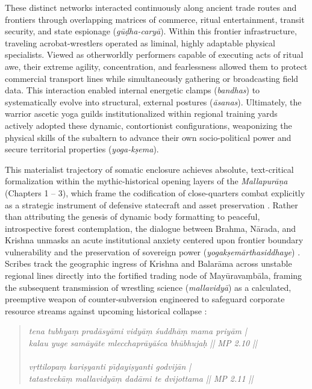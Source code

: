 \documentclass[11pt,twoside,letterpaper]{article}
\begin{document}
These distinct networks interacted continuously along ancient trade routes and frontiers through overlapping matrices of commerce, ritual entertainment, transit security, and state espionage (\textit{g\={u}\d{d}ha-cary\={a}}). Within this frontier infrastructure, traveling acrobat-wrestlers operated as liminal, highly adaptable physical specialists. Viewed as otherworldly performers capable of executing acts of ritual awe, their extreme agility, concentration, and fearlessness allowed them to protect commercial transport lines while simultaneously gathering or broadcasting field data. This interaction enabled internal energetic clamps (\textit{bandhas}) to systematically evolve into structural, external postures (\textit{\={a}sanas}). Ultimately, the warrior ascetic yoga guilds institutionalized within regional training yards actively adopted these dynamic, contortionist configurations, weaponizing the physical skills of the subaltern to advance their own socio-political power and secure territorial properties (\textit{yoga-k\d{s}ema}).

This materialist trajectory of somatic enclosure achieves absolute, text-critical formalization within the mythic-historical opening layers of the \textit{Mallapur\={a}\d{n}a} (Chapters 1 -- 3), which frame the codification of close-quarters combat explicitly as a strategic instrument of defensive statecraft and asset preservation \citep{MP_7_v1}. Rather than attributing the genesis of dynamic body formatting to peaceful, introspective forest contemplation, the dialogue between Brahma, N\={a}rada, and Krishna unmasks an acute institutional anxiety centered upon frontier boundary vulnerability and the preservation of sovereign power (\textit{yogak\d{s}em\={a}rthasiddhaye}) \citep{MP_7_v2}. Scribes track the geographic ingress of Krishna and Balar\={a}ma across unstable regional lines directly into the fortified trading node of May\={u}rava\d{m}b\={a}la, framing the subsequent transmission of wrestling science (\textit{mallavidy\={a}}) as a calculated, preemptive weapon of counter-subversion engineered to safeguard corporate resource streams against upcoming historical collapse \citep{MP_7_v3}:

\begin{quote}
\small
\noindent\textit{tena tubhya\d{m} prad\={a}sy\={a}mi vidy\={a}\d{m} \'{s}uddh\={a}\d{m} mama priy\={a}m |} \\
\noindent\textit{kalau yuge sam\={a}y\={a}te mlecchapr\={a}y\={a}\'{s}ca bh\={u}bhuja\d{h} || MP 2.10 ||} \\
\\
\noindent\textit{v\d{r}ttilopa\d{m} kari\d{s}yanti p\={\i}\d{d}ayi\d{s}yanti godvij\={a}n |} \\
\noindent\textit{tatastvek\={a}\d{m} mallavidy\={a}\d{m} dad\={a}mi te dvijottama || MP 2.11 ||}
\end{quote}
\end{document}
